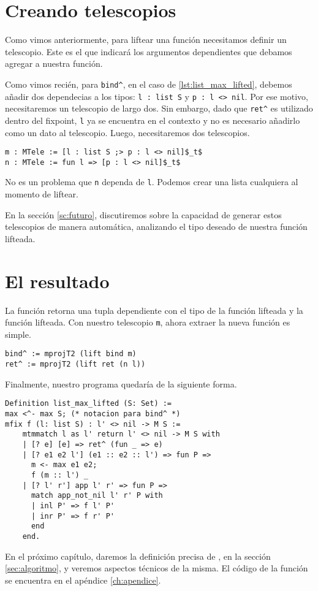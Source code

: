 \section{Creando telescopios}

Como vimos anteriormente, para liftear una función necesitamos definir un telescopio. Este es el que indicará los argumentos dependientes que debamos agregar a nuestra función.

Como vimos recién, para \lstinline{bind^}, en el caso de \ref{lst:list_max_lifted}, debemos añadir dos dependecias a los tipos: \lstinline{l : list S} y \lstinline{p : l <> nil}.
Por ese motivo, necesitaremos un telescopio de largo dos.
Sin embargo, dado que \lstinline{ret^} es utilizado dentro del fixpoint, \lstinline{l} ya se encuentra en el contexto y no es necesario añadirlo como un dato al telescopio. Luego, necesitaremos dos telescopios.

\begin{lstlisting}[frame=tb,caption={Telescopio para \lstinline{list_max}},label=lst:list_max_tele]
m : MTele := [l : list S ;> p : l <> nil]$_t$
n : MTele := fun l => [p : l <> nil]$_t$
\end{lstlisting}

No es un problema que \lstinline{n} dependa de \lstinline{l}. Podemos crear una lista cualquiera al momento de liftear.

En la sección \ref{sc:futuro}, discutiremos sobre la capacidad de generar estos telescopios de manera automática, analizando el tipo deseado de nuestra función lifteada.

\section{El resultado}

La función \lift retorna una tupla dependiente con el tipo de la función lifteada y la función lifteada.
Con nuestro telescopio \lstinline{m}, ahora extraer la nueva función es simple.

\begin{lstlisting}[float=h,frame=tb,caption={Lifteando \lstinline{ret} y \lstinline{bind}}]
bind^ := mprojT2 (lift bind m)
ret^ := mprojT2 (lift ret (n l))
\end{lstlisting}

Finalmente, nuestro programa quedaría de la siguiente forma.

\begin{lstlisting}[float=h,frame=tb,caption={Lifteando \lstinline{ret} y \lstinline{bind}}]
Definition list_max_lifted (S: Set) :=
max <^- max S; (* notacion para bind^ *)
mfix f (l: list S) : l' <> nil -> M S :=
    mtmmatch l as l' return l' <> nil -> M S with
    | [? e] [e] => ret^ (fun _ => e)
    | [? e1 e2 l'] (e1 :: e2 :: l') => fun P =>
      m <- max e1 e2;
      f (m :: l') _
    | [? l' r'] app l' r' => fun P =>
      match app_not_nil l' r' P with
      | inl P' => f l' P'
      | inr P' => f r' P'
      end
    end.
\end{lstlisting}

En el próximo capítulo, daremos la definición precisa de \lift, en la sección \ref{sec:algoritmo}, y veremos aspectos técnicos de la misma.
El código de la función se encuentra en el apéndice \ref{ch:apendice}.
